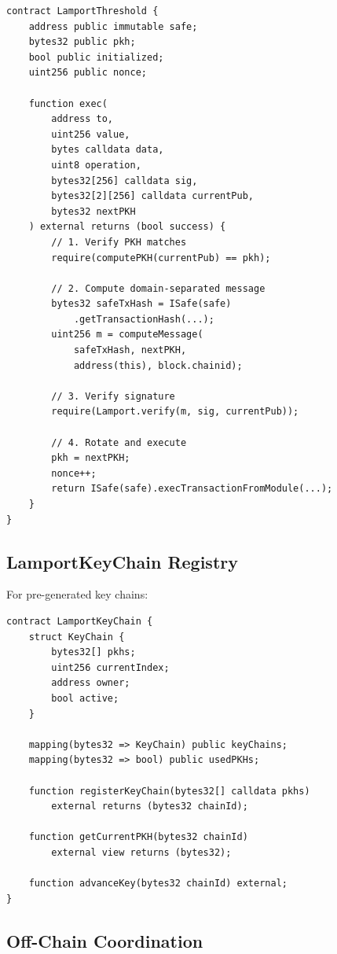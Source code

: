 \documentclass[11pt,a4paper]{article}
\begin{document}
\begin{lstlisting}[language=Solidity]
contract LamportThreshold {
    address public immutable safe;
    bytes32 public pkh;
    bool public initialized;
    uint256 public nonce;

    function exec(
        address to,
        uint256 value,
        bytes calldata data,
        uint8 operation,
        bytes32[256] calldata sig,
        bytes32[2][256] calldata currentPub,
        bytes32 nextPKH
    ) external returns (bool success) {
        // 1. Verify PKH matches
        require(computePKH(currentPub) == pkh);

        // 2. Compute domain-separated message
        bytes32 safeTxHash = ISafe(safe)
            .getTransactionHash(...);
        uint256 m = computeMessage(
            safeTxHash, nextPKH,
            address(this), block.chainid);

        // 3. Verify signature
        require(Lamport.verify(m, sig, currentPub));

        // 4. Rotate and execute
        pkh = nextPKH;
        nonce++;
        return ISafe(safe).execTransactionFromModule(...);
    }
}
\end{lstlisting}

\subsection{LamportKeyChain Registry}

For pre-generated key chains:

\begin{lstlisting}[language=Solidity]
contract LamportKeyChain {
    struct KeyChain {
        bytes32[] pkhs;
        uint256 currentIndex;
        address owner;
        bool active;
    }

    mapping(bytes32 => KeyChain) public keyChains;
    mapping(bytes32 => bool) public usedPKHs;

    function registerKeyChain(bytes32[] calldata pkhs)
        external returns (bytes32 chainId);

    function getCurrentPKH(bytes32 chainId)
        external view returns (bytes32);

    function advanceKey(bytes32 chainId) external;
}
\end{lstlisting}

\subsection{Off-Chain Coordination}
\end{document}
